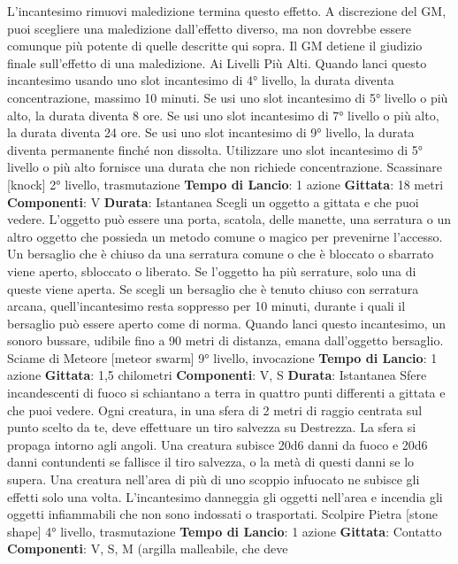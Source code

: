 \begin{multicols}{2}
L’incantesimo rimuovi maledizione termina questo
effetto. A discrezione del GM, puoi scegliere una
maledizione dall’effetto diverso, ma non dovrebbe
essere comunque più potente di quelle descritte qui
sopra. Il GM detiene il giudizio finale sull’effetto di una
maledizione.
Ai Livelli Più Alti. Quando lanci questo incantesimo
usando uno slot incantesimo di 4° livello, la durata
diventa concentrazione, massimo 10 minuti. Se usi uno
slot incantesimo di 5° livello o più alto, la durata diventa
8 ore. Se usi uno slot incantesimo di 7° livello o più alto,
la durata diventa 24 ore. Se usi uno slot incantesimo di
9° livello, la durata diventa permanente finché non
dissolta. Utilizzare uno slot incantesimo di 5° livello o
più alto fornisce una durata che non richiede
concentrazione.
Scassinare
[knock]
2° livello, trasmutazione
\textbf{Tempo di Lancio}: 1 azione
\textbf{Gittata}: 18 metri
\textbf{Componenti}: V
\textbf{Durata}: Istantanea
Scegli un oggetto a gittata e che puoi vedere. L’oggetto
può essere una porta, scatola, delle manette, una
serratura o un altro oggetto che possieda un metodo
comune o magico per prevenirne l’accesso.
Un bersaglio che è chiuso da una serratura comune o
che è bloccato o sbarrato viene aperto, sbloccato o
liberato. Se l’oggetto ha più serrature, solo una di
queste viene aperta.
Se scegli un bersaglio che è tenuto chiuso con
serratura arcana, quell’incantesimo resta soppresso per
10 minuti, durante i quali il bersaglio può essere aperto
come di norma.
Quando lanci questo incantesimo, un sonoro bussare,
udibile fino a 90 metri di distanza, emana dall’oggetto
bersaglio.
Sciame di Meteore
[meteor swarm]
9° livello, invocazione
\textbf{Tempo di Lancio}: 1 azione
\textbf{Gittata}: 1,5 chilometri
\textbf{Componenti}: V, S
\textbf{Durata}: Istantanea
Sfere incandescenti di fuoco si schiantano a terra in
quattro punti differenti a gittata e che puoi vedere. Ogni
creatura, in una sfera di 2 metri di raggio centrata sul
punto scelto da te, deve effettuare un tiro salvezza su
Destrezza. La sfera si propaga intorno agli angoli. Una
creatura subisce 20d6 danni da fuoco e 20d6 danni
contundenti se fallisce il tiro salvezza, o la metà di
questi danni se lo supera. Una creatura nell’area di più
di uno scoppio infuocato ne subisce gli effetti solo una
volta.
L’incantesimo danneggia gli oggetti nell’area e incendia
gli oggetti infiammabili che non sono indossati o
trasportati.
Scolpire Pietra
[stone shape]
4° livello, trasmutazione
\textbf{Tempo di Lancio}: 1 azione
\textbf{Gittata}: Contatto
\textbf{Componenti}: V, S, M (argilla malleabile, che deve

\end{multicols}
